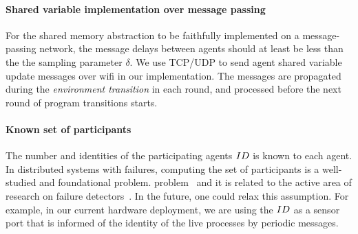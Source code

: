 \paragraph*{Shared variable implementation over message passing}
For the shared memory abstraction to be faithfully implemented on a message-passing  network, the message delays between agents should at least be less than the the sampling parameter $\delta$. We use TCP/UDP to send agent shared variable update messages over wifi in our implementation. The messages are propagated during the \emph{environment transition} in each round, and processed before the next round of program transitions starts.

\paragraph*{Known set of participants}
The number and identities of the participating agents $ID$ is known to each agent. In distributed systems with failures, computing the set of participants is a well-studied and foundational problem. problem~\cite{AlistarhAGG2011} and it is related to the active area of research on failure detectors~\cite{Chandra:1996,delporte2004weakest}. In the future, one could  relax this  assumption. For example, in our current hardware deployment, we are using the $ID$ as a sensor port that is informed of the identity of the live processes by periodic messages. 

%
%
%


